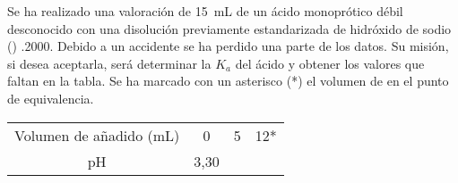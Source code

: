 Se ha realizado una valoración de \SI{15}{\milli\liter} de un ácido monoprótico débil desconocido con una disolución previamente estandarizada de hidróxido de sodio () \SI{,2000}{\Molar}. Debido a un accidente se ha perdido una parte de los datos. Su misión, si desea aceptarla, será determinar la $K_a$ del ácido y obtener los valores que faltan en la tabla. Se ha marcado con un asterisco (*) el volumen de  en el punto de equivalencia.
\begin{center}
	\begin{tabular}{cSSS}
		\toprule
		Volumen de  añadido (\si{\milli\liter}) & 0	& 5	& {\num{12}*}	\\
		pH 												 & 3,30	& 	& 				\\
		\bottomrule
	\end{tabular}
\end{center}
